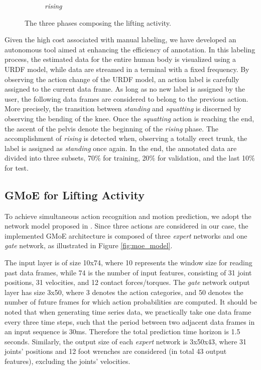 \begin{figure}[htp]
\begin{subfigure}[b]{0.15\textwidth}
         \caption{\emph{rising}}
         \label{fig:lift_rising}
     \end{subfigure}
        \caption{The three phases composing the lifting activity.}
        \label{fig:lift_activity}
\end{figure}

Given the high cost associated with manual labeling, we have developed an autonomous tool aimed at enhancing the efficiency of annotation. In this labeling process, the estimated data for the entire human body is visualized using a URDF model, while data are streamed in a terminal with a fixed frequency. By observing the action change of the URDF model, an action label is carefully assigned to the current data frame. As long as no new label is assigned by the user, the following data frames are considered to belong to the previous action. More precisely, the transition between \emph{standing} and \emph{squatting} is discerned by observing the bending of the knee. Once the \emph{squatting} action is reaching the end, the ascent of the pelvis denote the beginning of the \emph{rising} phase. The accomplishment of \emph{rising} is detected when, observing a totally erect trunk, the label is assigned as \emph{standing} once again. In the end, the annotated data are divided into three subsets, 70$\%$ for training, 20$\%$ for validation, and the last 10$\%$ for test.

\subsection{GMoE for Lifting Activity}
To achieve simultaneous action recognition and motion prediction, we adopt the network model proposed in \cite{Kourosh2022}. Since three actions are considered in our case, the implemented GMoE architecture is composed of three \emph{expert} networks and one \emph{gate} network, as illustrated in Figure \ref{fig:moe_model}.

The input layer is of size 10x74, where 10 represents the window size for reading past data frames, while 74 is the number of input features, consisting of 31 joint positions, 31 velocities, and 12 contact forces/torques. The \emph{gate} network output layer has size 3x50, where 3 denotes the action categories, and 50 denotes the number of future frames for which action probabilities are computed. It should be noted that when generating time series data, we practically take one data frame every three time steps, such that the period between two adjacent data frames in an input sequence is 30ms. Therefore the total prediction time horizon is 1.5 seconds. Similarly, the output size of each \emph{expert} network is 3x50x43, where 31 joints' positions and 12 foot wrenches are considered (in total 43 output features), excluding the joints' velocities.

